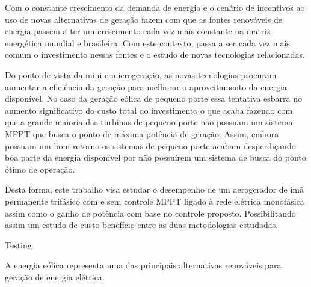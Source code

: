 Com o constante crescimento da demanda de energia e o cenário de incentivos ao uso de novas alternativas de geração fazem com que as fontes renováveis de energia passem a ter um crescimento cada vez mais constante na matriz energética mundial e brasileira. Com este contexto, passa a ser cada vez mais comum o investimento nessas fontes e o estudo de novas tecnologias relacionadas.

Do ponto de vista da mini e microgeração, as novas tecnologias procuram aumentar a eficiência da geração para melhorar o aproveitamento da energia disponível. No caso da geração eólica de pequeno porte essa tentativa esbarra no aumento significativo do custo total do investimento o que acaba fazendo com que a grande maioria das turbinas de pequeno porte não possuam um sistema MPPT que busca o ponto de máxima potência de geração. Assim, embora possuam um bom retorno os sistemas de pequeno porte acabam desperdiçando boa parte da energia disponível por não possuírem um sistema de busca do ponto ótimo de operação.

Desta forma, este trabalho visa estudar o desempenho de um aerogerador de imã permanente trifásico com e sem controle MPPT ligado à rede elétrica monofásica assim como o ganho de potência com base no controle proposto. Possibilitando assim um estudo de custo benefício entre as duas metodologias estudadas.


Testing



    
    A energia eólica representa uma das principais alternativas renováveis para geração de
    energia elétrica. 
    


